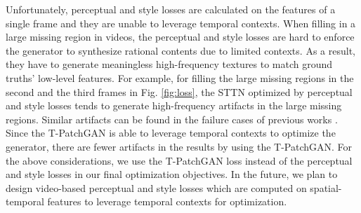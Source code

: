 \documentclass[runningheads]{llncs}
\begin{document}
Unfortunately, perceptual and style losses are calculated on the features of a single frame and they are unable to leverage temporal contexts. When filling in a large missing region in videos, the perceptual and style losses are hard to enforce the generator to synthesize rational contents due to limited contexts. As a result, they have to generate meaningless high-frequency textures to match ground truths' low-level features. 
For example, for filling the large missing regions in the second and the third frames in Fig. \ref{fig:loss}, the STTN optimized by perceptual and style losses tends to generate high-frequency artifacts in the large missing regions. 
Similar artifacts can be found in the failure cases of previous works \cite{chang2019free,liu2018image}. Since the T-PatchGAN is able to leverage temporal contexts to optimize the generator, there are fewer artifacts in the results by using the T-PatchGAN.
For the above considerations, we use the T-PatchGAN loss instead of the perceptual and style losses in our final optimization objectives. In the future, we plan to design video-based perceptual and style losses which are computed on spatial-temporal features to leverage temporal contexts for optimization.
\end{document}
